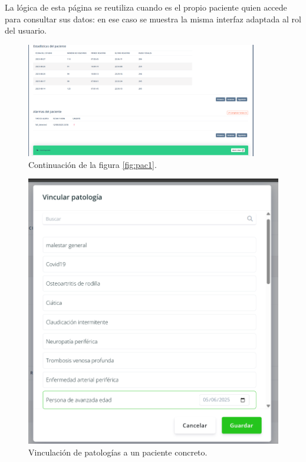 \documentclass[12pt, a4paper]{article}
\begin{document}
\begin{umaappendices}
		La lógica de esta página se reutiliza cuando es el propio paciente quien accede para consultar sus datos: en ese caso se muestra la misma interfaz adaptada al rol del usuario.
		

		
		\begin{figure}[htbp]
			\centering
			\includegraphics[width=0.9\textwidth]{images/6_patientID2.png}
			\caption[Ejemplo]{Continuación de la figura \ref{fig:pac1}.}
			\label{fig:pac2}
		\end{figure}
		
		\begin{figure}[htbp]
			\centering
			\includegraphics[width=1\textwidth]{images/7_vincular.png}
			\caption[Ejemplo]{Vinculación de patologías a un paciente concreto.}
			\label{fig:pato}
		\end{figure}
			

\end{umaappendices}
\end{document}
